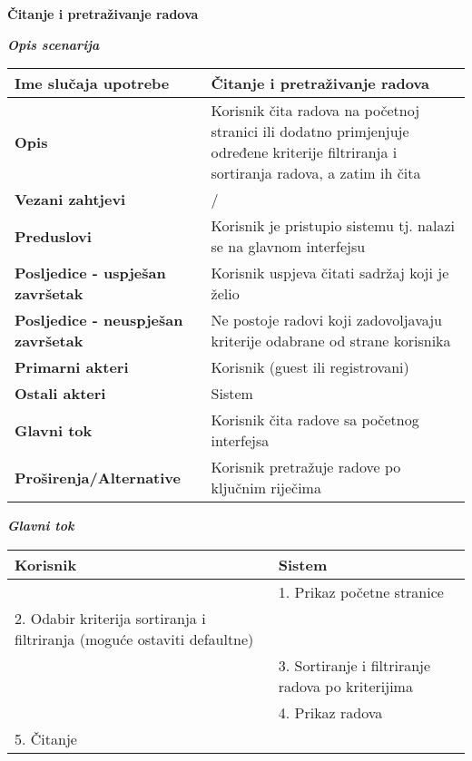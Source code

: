 \documentclass[12pt, a4paper]{report}
\begin{document}
\begin{flushleft}
{\large\textbf{Čitanje i pretraživanje radova}}  \newline

\textbf{\textit{Opis scenarija}} \\
\begin{tabular}{|m{7cm}|m{7cm}|} 
 \hline
 \textbf{Ime slučaja upotrebe} & Čitanje i pretraživanje radova \\ 
 \hline
 \textbf{Opis} & Korisnik čita radova na početnoj stranici ili dodatno primjenjuje određene kriterije filtriranja i sortiranja radova, a zatim ih čita \\ 
 \hline
 \textbf{Vezani zahtjevi} & / \\ 
 \hline
 \textbf{Preduslovi} & Korisnik je pristupio sistemu tj. nalazi se na glavnom interfejsu \\ 
 \hline
 \textbf{Posljedice - uspješan završetak} & Korisnik uspjeva čitati sadržaj koji je želio \\ 
 \hline
 \textbf{Posljedice - neuspješan završetak} & Ne postoje radovi koji zadovoljavaju kriterije odabrane od strane korisnika \\ 
 \hline
 \textbf{Primarni akteri} & Korisnik (guest ili registrovani) \\
 \hline
 \textbf{Ostali akteri} & Sistem \\ 
 \hline
 \textbf{Glavni tok} & Korisnik čita radove sa početnog interfejsa \\ 
 \hline
 \textbf{Proširenja/Alternative} & Korisnik pretražuje radove po ključnim riječima \\ 
 \hline
\end{tabular} \newpage

\textbf{\textit{Glavni tok}}
\begin{tabular}{|m{7cm}|m{7cm}|}
\hline
\textbf{Korisnik} & \textbf{Sistem} \\
\hline
  & 1. Prikaz početne stranice\\
\hline
 2. Odabir kriterija sortiranja i filtriranja (moguće ostaviti defaultne) & \\
\hline
 &  3. Sortiranje i filtriranje   radova po kriterijima\\
\hline
 & 4. Prikaz radova \\
\hline
5. Čitanje &  \\
\hline
\end{tabular} \newline \newline


\end{flushleft}
\end{document}
